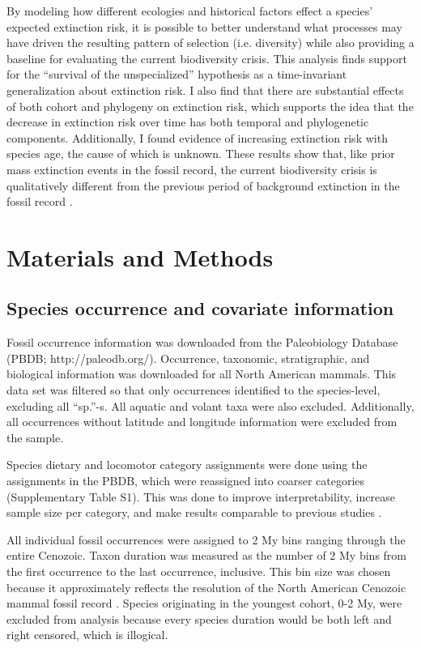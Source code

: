 By modeling how different ecologies and historical factors effect a species' expected extinction risk, it is possible to better understand what processes may have driven the resulting pattern of selection (i.e. diversity) while also providing a baseline for evaluating the current biodiversity crisis. This analysis finds support for the ``survival of the unspecialized'' hypothesis \cite{Simpson1944,Liow2004a} as a time-invariant generalization about extinction risk. I also find that there are substantial effects of both cohort and phylogeny on extinction risk, which supports the idea that the decrease in extinction risk \cite{Raup1982a} over time has both temporal and phylogenetic components. Additionally, I found evidence of increasing extinction risk with species age, the cause of which is unknown. These results show that, like prior mass extinction events in the fossil record, the current biodiversity crisis is qualitatively different from the previous period of background extinction in the fossil record \cite{Jablonski1986}.


\section{Materials and Methods}
\subsection{Species occurrence and covariate information}
Fossil occurrence information was downloaded from the Paleobiology Database (PBDB; http://paleodb.org/). Occurrence, taxonomic, stratigraphic, and biological information was downloaded for all North American mammals. This data set was filtered so that only occurrences identified to the species-level, excluding all ``sp.''-s. All aquatic and volant taxa were also excluded. Additionally, all occurrences without latitude and longitude information were excluded from the sample.

Species dietary and locomotor category assignments were done using the assignments in the PBDB, which were reassigned into coarser categories (Supplementary Table S1). This was done to improve interpretability, increase sample size per category, and make results comparable to previous studies \cite{Jernvall2004,Price2012}.

All individual fossil occurrences were assigned to 2 My bins ranging through the entire Cenozoic. Taxon duration was measured as the number of 2 My bins from the first occurrence to the last occurrence, inclusive. This bin size was chosen because it approximately reflects the resolution of the North American Cenozoic mammal fossil record \cite{Alroy2009,Alroy2000g,Marcot2014}. Species originating in the youngest cohort, 0-2 My, were excluded from analysis because every species duration would be both left and right censored, which is illogical.

